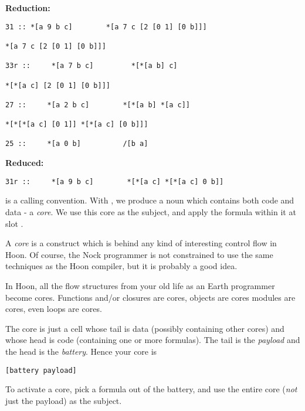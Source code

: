 \textbf{ Reduction:}

\begin{framed_shaded}
\begin{Verbatim}[fontsize=\relsize{-2.5},commandchars=\\\{\}]
31 :: *[a 9 b c]        *[a 7 c [2 [0 1] [0 b]]]

*[a 7 c [2 [0 1] [0 b]]]

33r ::     *[a 7 b c]         *[*[a b] c]

*[*[a c] [2 [0 1] [0 b]]]

27 ::     *[a 2 b c]        *[*[a b] *[a c]]

*[*[*[a c] [0 1]] *[*[a c] [0 b]]]

25 ::     *[a 0 b]          /[b a]
\end{Verbatim}
\end{framed_shaded}
\textbf{ Reduced:}    

\begin{framed_shaded}
\begin{Verbatim}[fontsize=\relsize{-2.5},commandchars=\\\{\}]
31r ::     *[a 9 b c]        *[*[a c] *[*[a c] 0 b]] 
\end{Verbatim}
\end{framed_shaded}

 is a calling convention.  With , we produce a noun which contains both
code and data - a \emph{core}.  We use this core as the subject, and apply the
formula within it at slot .

A \emph{core} is a construct which is behind any kind of interesting control flow in
Hoon.  Of course, the Nock programmer is not constrained to use the same
techniques as the Hoon compiler, but it is probably a good idea. 

In Hoon, all the flow structures from your old life as an Earth programmer
become cores.  Functions and/or closures are cores, objects are cores modules
are cores, even loops are cores.

The core is just a cell whose tail is data (possibly containing other cores)
and whose head is code (containing one or more formulas).  The tail is the
\emph{payload} and the head is the \emph{battery}.  Hence your core is

\begin{framed_shaded}
\begin{Verbatim}[fontsize=\relsize{-2.5},commandchars=\\\{\}]
[battery payload]
\end{Verbatim}
\end{framed_shaded}
To activate a core, pick a formula out of the battery, and use the entire core
(\emph{not} just the payload) as the subject.  

